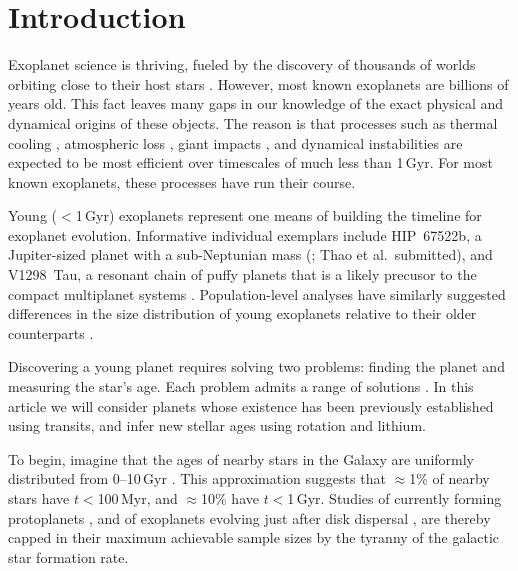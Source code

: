 \documentclass[11pt,twocolumn,tighten,linenumbers]{aastex63}
\begin{document}

\section{Introduction}
\label{sec:intro}

Exoplanet science is thriving, fueled by the discovery of thousands of
worlds orbiting close to their host stars
\citep{Borucki10,2015JATIS...1a4003R}.  However, most known exoplanets
are billions of years old.  This fact leaves many gaps in our
knowledge of the exact physical and dynamical origins of these
objects.  The reason is that processes such as thermal cooling
\citep{2007ApJ...659.1661F}, atmospheric loss
\citep{2019AREPS..47...67O}, giant impacts
\citep{2014prpl.conf..595R}, and dynamical instabilities
\citep{2017MNRAS.470.1750I} are expected to be most efficient over
timescales of much less than 1\,Gyr.  For most known exoplanets, these
processes have run their course.

Young ($<$1\,Gyr) exoplanets represent one means of building the
timeline for exoplanet evolution.  Informative individual exemplars
include HIP~67522b, a Jupiter-sized planet with a sub-Neptunian mass
(\citealt{Rizzuto_2020}; Thao et al.~submitted), and V1298~Tau, a
resonant chain of puffy planets that is a likely precusor to the
compact multiplanet systems \citep{David_2019}.  Population-level
analyses have similarly suggested differences in the size distribution
of young exoplanets relative to their older counterparts
\citep{Berger_2020b_rpage,David_2021,Sandoval_2021,2023AJ....166..248C,2024arXiv240303261V}.

Discovering a young planet requires solving two problems: finding the
planet and measuring the star's age.  Each problem admits a range of
solutions
\citep[e.g.][]{2008Sci...322.1348M,2012ApJ...756L..33Q,2024AJ....167..193T}.
In this article we will consider planets whose existence has been
previously established using transits, and infer new stellar ages
using rotation and lithium.

To begin, imagine that the ages of nearby stars in the Galaxy are
uniformly distributed from 0--10\,Gyr
\citep[][]{2000MNRAS.318..658B,Nordstrom_2004}.  This approximation
suggests that $\approx$1\% of nearby stars have $t$$<$100\,Myr, and
$\approx$10\% have $t$$<$1\,Gyr.  Studies of currently forming
protoplanets \citep{2018A&A...617A..44K}, and of exoplanets evolving
just after disk dispersal \citep[e.g.][]{2022MNRAS.512.5067K}, are
thereby capped in their maximum achievable sample sizes by the tyranny
of the galactic star formation rate.
\end{document}
